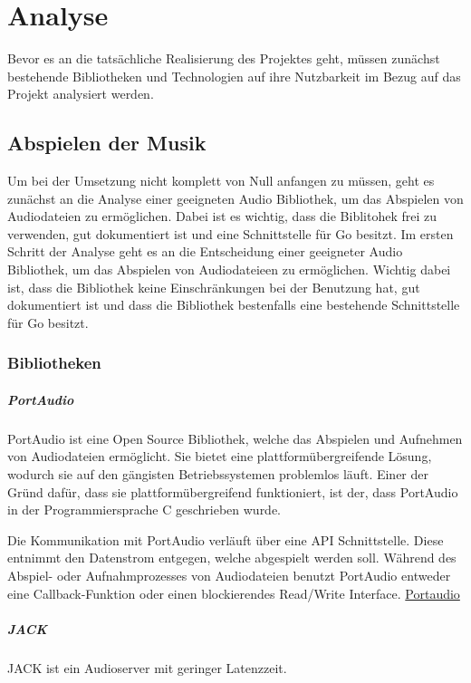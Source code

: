 
\chapter{Analyse}
Bevor es an die tatsächliche Realisierung des Projektes geht, müssen zunächst
bestehende Bibliotheken und Technologien auf ihre Nutzbarkeit im Bezug auf das
Projekt analysiert werden. 

\section{Abspielen der Musik}
Um bei der Umsetzung nicht komplett von Null anfangen zu müssen, geht es
zunächst an die Analyse einer geeigneten Audio Bibliothek, um das Abspielen von
Audiodateien zu ermöglichen. Dabei ist es wichtig, dass die Biblitohek frei zu
verwenden, gut dokumentiert ist und eine Schnittstelle für Go besitzt.  Im
ersten Schritt der Analyse geht es an die Entscheidung einer geeigneter Audio
Bibliothek, um das Abspielen von Audiodateieen zu ermöglichen. Wichtig dabei
ist, dass die Bibliothek keine Einschränkungen bei der Benutzung hat, gut
dokumentiert ist und dass die Bibliothek bestenfalls eine bestehende
Schnittstelle für Go besitzt.
\subsection{Bibliotheken}
\paragraph{PortAudio}
PortAudio ist eine Open Source Bibliothek, welche das Abspielen und Aufnehmen
von Audiodateien ermöglicht. Sie bietet eine plattformübergreifende Lösung,
wodurch sie auf den gängisten Betriebssystemen problemlos läuft. Einer der
Gründ dafür, dass sie plattformübergreifend funktioniert, ist der, dass
PortAudio in der Programmiersprache C geschrieben wurde. \hfill \break

Die Kommunikation mit PortAudio verläuft über eine \ac{API} Schnittstelle.
Diese entnimmt den Datenstrom entgegen, welche abgespielt werden soll. Während
des Abspiel- oder Aufnahmprozesses von Audiodateien benutzt PortAudio entweder
eine Callback-Funktion oder einen blockierendes Read/Write Interface.
\href{http://www.portaudio.com/}{Portaudio}

\paragraph{JACK}
JACK ist ein Audioserver mit geringer Latenzzeit. 

